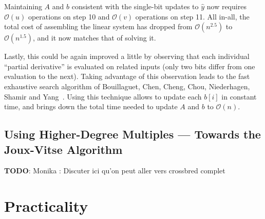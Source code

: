 \documentclass[a4paper,UKenglish,cleveref, autoref]{lipics-v2019}
\newcommand{\bigO}[1]{\ensuremath{\mathcal{O}\left( #1 \right)} }
\newcommand{\red}{\color{red}}
\newcommand{\TODO}[1]{{\red \textbf{TODO}:} #1\xspace}
\begin{document}
Maintaining $A$ and $b$ consistent with the single-bit updates to $\hat y$ now
requires $\bigO{u}$ operations on step 10 and $\bigO{v}$ operations on step
11. All in-all, the total cost of assembling the linear system has dropped from
$\bigO{n^{2.5}}$ to $\bigO{n^{1.5}}$, and it now matches that of solving it.

Lastly, this could be again improved a little by observing that each individual
``partial derivative'' is evaluated on related inputs (only two bits differ from
one evaluation to the next). Taking advantage of this observation leads to the
fast exhaustive search algorithm of Bouillaguet, Chen, Cheng, Chou, Niederhagen,
Shamir and Yang~\cite{BouillaguetCCCNSY10}. Using this technique allows to
update each $b[i]$ in constant time, and brings down the total time needed to
update $A$ and $b$ to $\bigO{n}$.

\subsection{Using Higher-Degree Multiples --- Towards the Joux-Vitse Algorithm}

\TODO{Monika : Discuter ici qu'on peut aller vers crossbred complet}





\section{Practicality}
\end{document}
